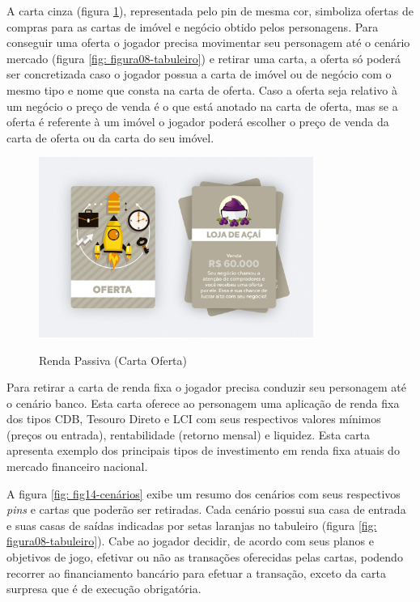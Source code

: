 A carta cinza (figura \ref{fig: fig13-carta-oferta}), representada pelo pin de mesma cor, simboliza ofertas de compras para as cartas de imóvel e negócio obtido pelos personagens. Para conseguir uma oferta o jogador precisa movimentar seu personagem até o cenário mercado (figura \ref{fig: figura08-tabuleiro}) e retirar uma carta, a oferta só poderá ser concretizada caso o jogador possua a carta de imóvel ou de negócio com o mesmo tipo e nome que consta na carta de oferta. Caso a oferta seja relativo à um negócio o preço de venda é o que está anotado na carta de oferta, mas se a oferta é referente à um imóvel o jogador poderá escolher o preço de venda da carta de oferta ou da carta do seu imóvel.

\graphicspath{{figuras/}}
\begin{figure}[!ht]
\centering
\begin{minipage}{0.8\textwidth}
\caption{Renda Passiva (Carta Oferta)}
\centering
\includegraphics[width=0.8\textwidth]{figuras/fig13-carta-oferta.jpg}
\label{fig: fig13-carta-oferta}
\end{minipage}
\end{figure}

Para retirar a carta de renda fixa o jogador precisa conduzir seu personagem até o cenário banco. Esta carta oferece ao personagem uma aplicação de renda fixa dos tipos CDB, Tesouro Direto e LCI com seus respectivos valores mínimos (preços ou entrada), rentabilidade (retorno mensal) e liquidez. Esta carta apresenta exemplo dos principais tipos de investimento em renda fixa atuais do mercado financeiro nacional.

A figura \ref{fig: fig14-cenários} exibe um resumo dos cenários com seus respectivos \textit{pins} e cartas que poderão ser retiradas. Cada cenário possui sua casa de entrada e suas casas de saídas indicadas por setas laranjas no tabuleiro (figura \ref{fig: figura08-tabuleiro}). Cabe ao jogador decidir, de acordo com seus planos e objetivos de jogo, efetivar ou não as transações oferecidas pelas cartas, podendo recorrer ao financiamento bancário para efetuar a transação, exceto da carta surpresa que é de execução obrigatória.

